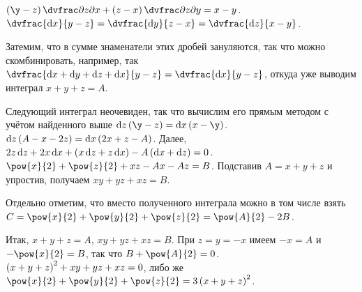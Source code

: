 \documentclass[a5paper,10pt]{article}
\begin{document}
    $\br{\y - z} \vparder{z}{x} + \br{z - x} \vparder{z}{y} = x - y$.
    $\dvfrac {\di x} {y - z}
    = \dvfrac {\di y} {z - x}
    = \dvfrac {\di z} {x - y}$.

    Затемим, что в сумме знаменатели этих дробей зануляются, 
    так что можно скомбинировать, например, так
    $\dvfrac{\di x + \di y + \di z + \di x}{y - z} = \dvfrac {\di x} {y - z}$,
    откуда уже выводим интеграл
    $x + y + z = A$.

    Следующий интеграл неочевиден, так что вычислим его прямым методом с учётом найденного выше
    $\di z \br{\y - z} = \di x \br{x - \y}$. 
    $\di z \br{A - x - 2z} = \di x \br{2x + z - A}$. Далее,
    $2z \di z + 2x \di x + \br{x \di z + z \di x} - A\br{\di x + \di z} = 0$.
    $\pow{x}{2} + \pow{z}{2} + xz - Ax - Az = B$.
    Подставив $A = x + y + z$ и упростив, получаем
    $xy + yz + xz = B$.
    
    Отдельно отметим, что вместо полученного интеграла можно в том числе взять
    $C = \pow{x}{2} + \pow{y}{2} + \pow{z}{2} = \pow{A}{2} - 2B$.

    Итак, $x + y + z = A$, $xy + yz + xz = B$. При $z = y = -x$ имеем
    $-x = A$ и $-\pow{x}{2} = B$, так что $B + \pow{A}{2} = 0$.
    $\left(\hspace{0.01em}x + y + z\hspace{0.01em}\right)^2 + xy + yz + xz = 0$, либо же
    $\pow{x}{2} + \pow{y}{2} + \pow{z}{2} = 3 \br{x + y + z}^2$.
\end{document}
